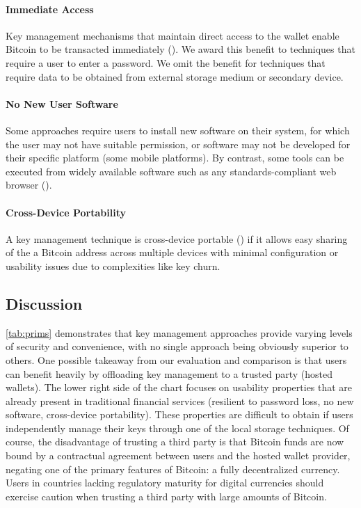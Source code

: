 \paragraph{Immediate Access}
\label{Immediate Access}
Key management mechanisms that maintain direct access to the wallet enable Bitcoin to be transacted immediately (\full). We award this benefit to techniques that require a user to enter a password. We omit the benefit for techniques that require data to be obtained from external storage medium or secondary device. 

\paragraph{No New User Software}
\label{No New Software}
Some approaches require users to install new software on their system, for which the user may not have suitable permission, or software may not be developed for their specific platform (\eg some mobile platforms). By contrast, some tools can be executed from widely available software such as any standards-compliant web browser (\full). 

\paragraph{Cross-Device Portability}
\label{Portable}
A key management technique is cross-device portable (\full) if it allows easy sharing of the a Bitcoin address across multiple devices with minimal configuration or usability issues due to complexities like key churn.

\subsection{Discussion}
\autoref{tab:prims} demonstrates that key management approaches provide varying levels of security and convenience, with no single approach being obviously superior to others. One possible takeaway from our evaluation and comparison is that users can benefit heavily by offloading key management to a trusted party (\eg hosted wallets). The lower right side of the chart focuses on usability properties that are already present in traditional financial services (\ie resilient to password loss, no new software, cross-device portability). These properties are difficult to obtain if users independently manage their keys through one of the local storage techniques. Of course, the disadvantage of trusting a third party is that Bitcoin funds are now bound by a contractual agreement between users and the hosted wallet provider, negating one of the primary features of Bitcoin: a fully decentralized currency. Users in countries lacking regulatory maturity for digital currencies should exercise caution when trusting a third party with large amounts of Bitcoin. 

